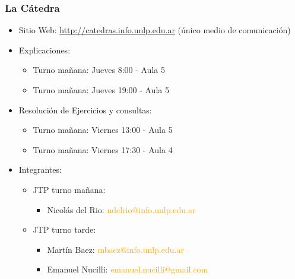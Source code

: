 \begin{frame}
  \frametitle{La Cátedra}
  \begin{itemize}
	  \item Sitio Web: \textcolor{orange}{\url{http://catedras.info.unlp.edu.ar}} (único medio de comunicación)
	  \item Explicaciones: 
	  \begin{itemize}
	  	\item Turno mañana: Jueves 8:00 - Aula 5
	  	\item Turno mañana: Jueves 19:00 - Aula 5
	  \end{itemize}
	  \item Resolución de Ejercicios y consultas: 
	  \begin{itemize}
	  	\item Turno mañana: Viernes 13:00 - Aula 5
	  	\item Turno mañana: Viernes 17:30 - Aula 4
	  \end{itemize}
	  \item Integrantes:
	  \begin{itemize}
	  	\item JTP turno mañana:
	  	\begin{itemize}
	  		\item Nicolás del Rio: \textcolor{orange}{ndelrio@info.unlp.edu.ar}
	  	\end{itemize}
	  	\item JTP turno tarde:
	  	\begin{itemize}
	  		\item Martín Baez: \textcolor{orange}{mbaez@info.unlp.edu.ar}
	  		\item Emanuel Nucilli: \textcolor{orange}{emanuel.nucilli@gmail.com}
	  	\end{itemize}  	
	  \end{itemize}
  \end{itemize}
  \begin{table}
	      \centering
  \end{table}
\end{frame}

